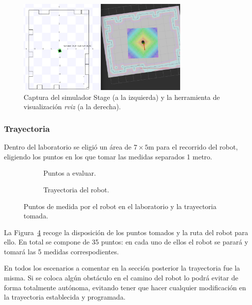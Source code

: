 \begin{figure}[H] 
    \centering
    \includegraphics[width=0.75\textwidth]{pic/Stage-rviz.png}
    \caption{Captura del simulador Stage (a la izquierda) y la herramienta de visualización \textit{rviz} (a la derecha).}
    \label{fig:stage_rviz}
\end{figure}

\subsubsection{Trayectoria}

Dentro del laboratorio se eligió un área de $7 \times 5 \si{\meter}$ para el recorrido del robot, eligiendo los puntos en los que tomar las medidas separados 1 metro.

\begin{figure}[H]
    \begin{subfigure}[b]{.45\textwidth}
        \centering
        \def\svgwidth{0.6\linewidth}
	     
        \caption{Puntos a evaluar.}
        \label{fig:puntos}
    \end{subfigure}
    \begin{subfigure}[b]{.45\textwidth}
        \centering
        \def\svgwidth{0.6\linewidth}
	     
        \caption{Trayectoria del robot.}
        \label{fig:vertical}
    \end{subfigure}
    \caption{Puntos de medida por el robot en el laboratorio y la trayectoria tomada.}
    \label{fig:laboratorio}
\end{figure}

La Figura~\ref{fig:laboratorio} recoge la disposición de los puntos tomados y la ruta del robot para ello.
En total se compone de 35 puntos: en cada uno de ellos el robot se parará y tomará las 5 medidas correspodientes.

En todos los escenarios a comentar en la sección posterior la trayectoria fue la misma.
Si se coloca algún obstáculo en el camino del robot lo podrá evitar de forma totalmente autónoma, evitando tener que hacer cualquier modificación en la trayectoria establecida y programada.

